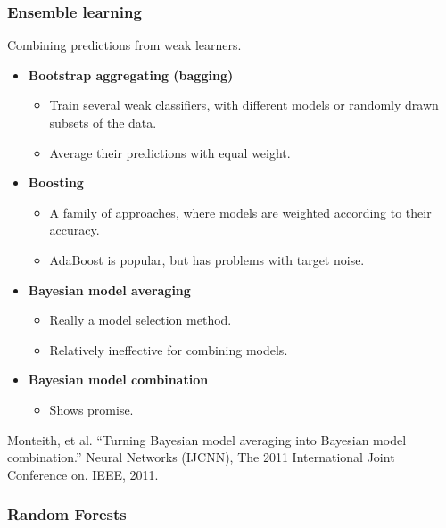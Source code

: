 \begin{frame}
\frametitle{Ensemble learning}
Combining predictions from weak learners.
\begin{itemize}
\item {\bf Bootstrap aggregating (bagging)}
\begin{itemize}
\item Train several weak classifiers, with different models or randomly drawn subsets of the data.
\item Average their predictions with equal weight.
\end{itemize}
\item {\bf Boosting}
\begin{itemize}
\item A family of approaches, where models are weighted according to their accuracy.
\item AdaBoost is popular, but has problems with target noise.
\end{itemize}
\item {\bf Bayesian model averaging}
\begin{itemize}
\item Really a model selection method.
\item Relatively ineffective for combining models.
\end{itemize}
\item {\bf Bayesian model combination}
\begin{itemize}
\item Shows promise.
\end{itemize}
\end{itemize}
\begin{tiny}
Monteith, et al. ``Turning Bayesian model averaging into Bayesian model combination.'' Neural Networks (IJCNN), The 2011 International Joint Conference on. IEEE, 2011.\par
\end{tiny}
\end{frame}

\begin{frame}
\frametitle{Random Forests}
\end{frame}


